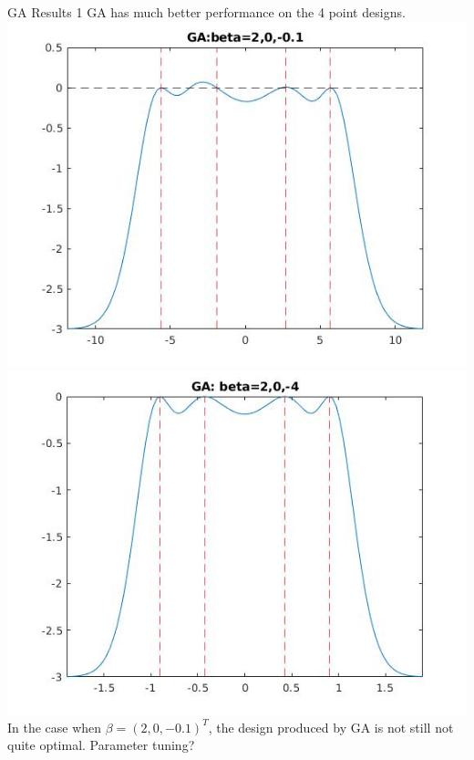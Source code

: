 \documentclass[11pt]{beamer}
\begin{document}
\begin{frame}{GA Results 1}
GA has much better performance on the 4 point designs.
\includegraphics[scale=0.28]{quadplots/GA_1.jpg}
\includegraphics[scale=0.28]{quadplots/GA_2.jpg}\\
In the case when $\beta = (2,0,-0.1)^T$, the design produced by GA is not still not quite optimal. Parameter tuning?
\end{frame}
\end{document}
